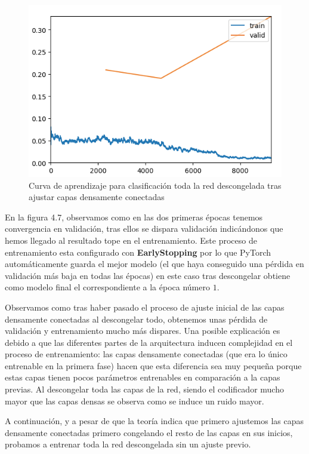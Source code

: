 \begin{figure}[H]
	\centering
	\includegraphics[width=0.7\linewidth]{imagenes/task1_unfreeze.png}
	\caption{Curva de aprendizaje para clasificación toda la red descongelada tras ajustar capas densamente conectadas}
\end{figure}

En la figura 4.7, observamos como en las dos primeras épocas tenemos convergencia en validación, tras ellos se dispara validación indicándonos que hemos llegado al resultado tope en el entrenamiento. Este proceso de entrenamiento esta configurado con \textbf{EarlyStopping} por lo que PyTorch automáticamente guarda el mejor modelo (el que haya conseguido una pérdida en validación más baja en todas las épocas) en este caso tras descongelar obtiene como modelo final el correspondiente a la época número $1$. 

Observamos como tras haber pasado el proceso de ajuste inicial de las capas densamente conectadas al descongelar todo, obtenemos unas pérdida de validación y entrenamiento mucho más dispares. Una posible explicación es debido a que las diferentes partes de la arquitectura inducen complejidad en el proceso de entrenamiento: las capas densamente conectadas (que era lo único entrenable en la primera fase) hacen que esta diferencia sea muy pequeña porque estas capas tienen pocos parámetros entrenables en comparación a la capas previas. Al descongelar toda las capas de la red, siendo el codificador mucho mayor que las capas densas se observa como se induce un ruido mayor.


A continuación, y a pesar de que la teoría indica que primero ajustemos las capas densamente conectadas primero congelando el resto de las capas en sus inicios, probamos a entrenar toda la red descongelada sin un ajuste previo.

